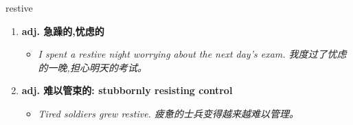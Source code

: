 
\begin{frame}
{\huge restive}
\begin{center}
\begin{enumerate}\Large
  \item \textbf{adj. 急躁的,忧虑的}
  \begin{itemize}
    \item \em{\Large{I spent a restive night worrying about the next day's exam. 我度过了忧虑的一晚,担心明天的考试。}}
  \end{itemize}
  \item \textbf{adj. 难以管束的: stubbornly resisting control}
  \begin{itemize}
    \item \em{\Large{Tired soldiers grew restive. 疲惫的士兵变得越来越难以管理。}}
  \end{itemize}
\end{enumerate}
\end{center}
\end{frame}
